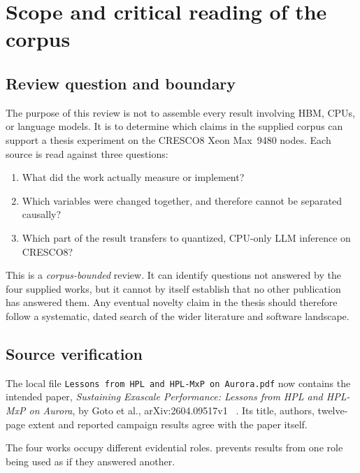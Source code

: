 \section{Scope and critical reading of the corpus}
\label{sec:corpus}

\subsection{Review question and boundary}

The purpose of this review is not to assemble every result involving
HBM, CPUs, or language models.  It is to determine which claims in the
supplied corpus can support a thesis experiment on the CRESCO8 Xeon
Max~9480 nodes.  Each source is read against three questions:

\begin{enumerate}
  \item What did the work actually measure or implement?
  \item Which variables were changed together, and therefore cannot be
        separated causally?
  \item Which part of the result transfers to quantized, CPU-only LLM
        inference on CRESCO8?
\end{enumerate}

This is a \emph{corpus-bounded} review.  It can identify questions not
answered by the four supplied works, but it cannot by itself establish
that no other publication has answered them.  Any eventual novelty
claim in the thesis should therefore follow a systematic, dated search
of the wider literature and software landscape.

\subsection{Source verification}

The local file
\texttt{Lessons from HPL and HPL-MxP on Aurora.pdf} now contains the
intended paper, \emph{Sustaining Exascale Performance: Lessons from HPL
and HPL-MxP on Aurora}, by Goto et al., arXiv:2604.09517v1
~\cite{goto2026aurorahpl}.  Its title, authors, twelve-page extent and
reported campaign results agree with the paper itself.

The four works occupy different evidential roles.
 prevents results from one role being used as
if they answered another.

